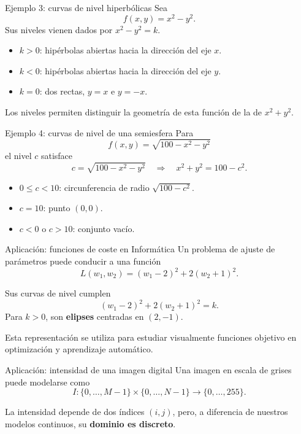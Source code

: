\documentclass[main.tex]{subfiles}
\begin{document}
\begin{frame}{Ejemplo 3: curvas de nivel hiperbólicas}
Sea
\[
f(x,y)=x^2-y^2.
\]
Sus niveles vienen dados por $x^2-y^2=k$.
\begin{itemize}
  \item $k>0$: hipérbolas abiertas hacia la dirección del eje $x$.
  \item $k<0$: hipérbolas abiertas hacia la dirección del eje $y$.
  \item $k=0$: dos rectas, $y=x$ e $y=-x$.
\end{itemize}
\medskip

Los niveles permiten distinguir la geometría de esta función de la de $x^2+y^2$.
\end{frame}

\begin{frame}{Ejemplo 4: curvas de nivel de una semiesfera}
Para
\[
f(x,y)=\sqrt{100-x^2-y^2}
\]
el nivel $c$ satisface
\[
c=\sqrt{100-x^2-y^2}
\quad\Longrightarrow\quad
\boxed{x^2+y^2=100-c^2.}
\]
\medskip
\begin{itemize}
  \item $0\leq c<10$: circunferencia de radio $\sqrt{100-c^2}$.
  \item $c=10$: punto $(0,0)$.
  \item $c<0$ o $c>10$: conjunto vacío.
\end{itemize}
\end{frame}

\begin{frame}{Aplicación: funciones de coste en Informática}
Un problema de ajuste de parámetros puede conducir a una función
\[
L(w_1,w_2)=(w_1-2)^2+2(w_2+1)^2.
\]
\medskip

Sus curvas de nivel cumplen
\[
(w_1-2)^2+2(w_2+1)^2=k.
\]
Para $k>0$, son \textbf{elipses} centradas en $(2,-1)$.
\medskip

Esta representación se utiliza para estudiar visualmente funciones objetivo en optimización y aprendizaje automático.
\end{frame}

\begin{frame}{Aplicación: intensidad de una imagen digital}
Una imagen en escala de grises puede modelarse como
\[
I:\{0,\ldots,M-1\}\times\{0,\ldots,N-1\}
\longrightarrow\{0,\ldots,255\}.
\]
\medskip

La intensidad depende de dos índices $(i,j)$, pero, a diferencia de nuestros modelos continuos, su \textbf{dominio es discreto}.
\medskip

\end{frame}
\end{document}
